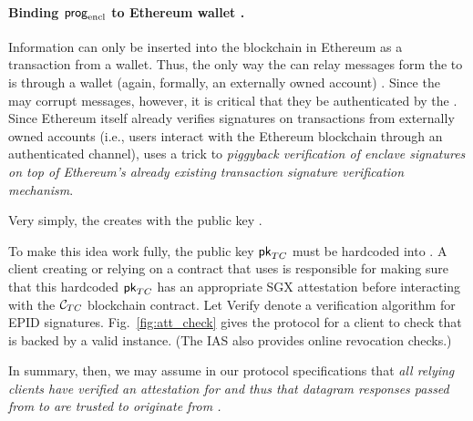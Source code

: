 \paragraph{Binding ${\sf prog}_{\textrm{encl}}$ to Ethereum wallet \tcadd.}
Information can only be inserted into the blockchain in Ethereum as a transaction from a wallet. Thus, the only way the \medname can relay messages form the \encname to \tcont is through a wallet (again, formally, an externally owned account) \tcadd. Since the \medname may corrupt messages, however, it is critical that they be authenticated by the \encname. Since Ethereum itself 
already verifies signatures on transactions from externally owned accounts (i.e., users interact with the  Ethereum blockchain through an authenticated channel), \tc uses a trick to {\it piggyback verification of enclave signatures on top of Ethereum's already existing transaction signature verification mechanism}. 

Very simply, the \encname creates \tcadd with the public key \pkTC. 

To make this idea work fully, the public key ${\sf pk}_{TC}$ must be hardcoded into \tcont. A client creating or relying on a contract that uses \tcont is responsible for making sure that this hardcoded ${\sf pk}_{TC}$ has an appropriate SGX attestation before interacting with the ${\cal C}_{TC}$  blockchain contract.  Let {\sf Verify} denote a verification algorithm for EPID signatures. Fig.~\ref{fig:att_check} gives the protocol for a client to check that \tcont is backed by a valid \encname instance. (The IAS also provides online revocation checks.)  

In summary, then, we may assume in our protocol specifications that {\em all relying clients have verified an attestation for \encname and thus that datagram responses passed from \tcadd to \tcont are trusted to originate from \engine.} 



